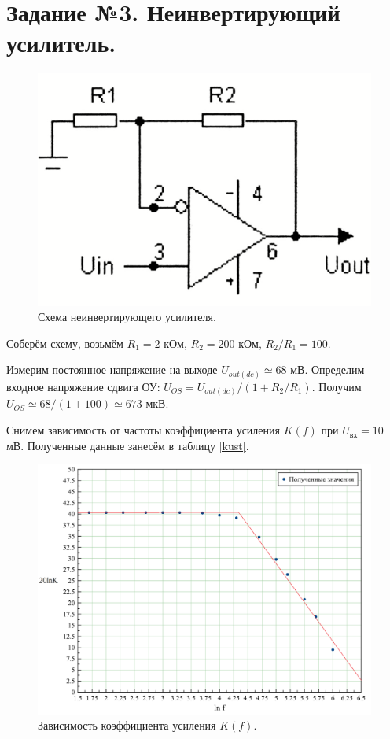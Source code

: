 \documentclass[a4paper, 12pt, twoside]{article}
\begin{document}
\section*{Задание №3. Неинвертирующий усилитель.}

\begin{figure}[H]
	\centering
	\includegraphics[width =  0.3\linewidth]{nus}
	\caption{Схема неинвертирующего усилителя.}
	\label{nus}
\end{figure}

Соберём схему, возьмём $R_1 = 2$ кОм, $R_2 = 200$ кОм, $R_2/R_1 = 100$.
\vspace{\baselineskip}

Измерим постоянное напряжение на выходе $U_{out(dc)} \simeq 68$ мВ. Определим входное напряжение сдвига ОУ: $U_{OS} = U_{out(dc)}/(1+R_2/R_1).$ Получим $U_{OS} \simeq 68/(1 + 100)\simeq 673$ мкВ.
\vspace{\baselineskip}

Снимем зависимость от частоты коэффициента усиления $K(f)$ при $U_{\text{вх}} = 10$ мВ. Полученные данные занесём в таблицу \ref{kust}.

\begin{table}[H]
	\centering
	\caption{Зависимость коэффициента усиления $K(f)$.}
	\label{kust}
\end{table}

\begin{figure}[H]
	\centering
	\includegraphics[width =  0.5\linewidth]{3}
	\caption{Зависимость коэффициента усиления $K(f)$.}
	\label{kf}
\end{figure}
\end{document}
